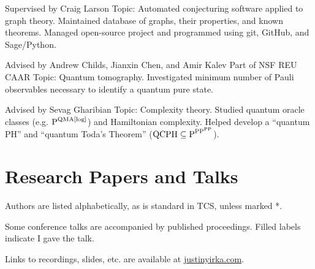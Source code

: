\documentclass[11pt,letterpaper,serif]{moderncv}
\begin{document}
{
	\begin{adjustwidth}{.25in}{}
		Supervised by Craig Larson \newline
		Topic: Automated conjecturing software applied to graph theory.\newline
		Maintained database of graphs, their properties, and known theorems. Managed open-source project and programmed using git, GitHub, and Sage/Python.
	\end{adjustwidth}
}

{}{}{}
{
	\begin{adjustwidth}{.25in}{}
		Advised by Andrew Childs, Jianxin Chen, and Amir Kalev \newline
		Part of NSF REU CAAR \newline
		Topic: Quantum tomography. Investigated minimum number of Pauli observables necessary to identify a quantum pure state.
	\end{adjustwidth}
}

{
	\begin{adjustwidth}{.25in}{}
		Advised by Sevag Gharibian \newline
		Topic: Complexity theory. Studied quantum oracle classes  (e.g. {\scriptsize $\textup{P}^{\textup{QMA[log]}}$}) and Hamiltonian complexity. Helped develop a ``quantum PH'' and ``quantum Toda's Theorem'' ({\scriptsize $\textup{QCPH}\subseteq \textup{P}^{\textup{PP}^{\textup{PP}}}$}).
	\end{adjustwidth}
}

\section{Research Papers and Talks}
\vspace{-.1in}
{\footnotesize
	Authors are listed alphabetically, as is standard in TCS, unless marked *.

	Some conference talks are accompanied by published proceedings.
	Filled labels \textbullet{} indicate I gave the talk.

	Links to recordings, slides, etc. are available at \href{https://www.justinyirka.com/}{justinyirka.com}.

}
\medskip
\end{document}
